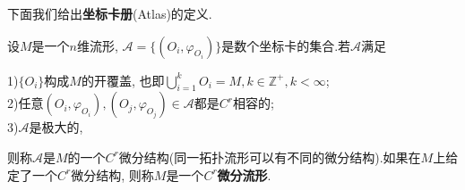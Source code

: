 下面我们给出\textbf{坐标卡册}(Atlas)的定义.
\begin{definition}
  设$M$是一个$n$维流形, $\mathcal{A}=\{(O_i,\varphi_{O_i})\}$是数个坐标卡的集合.若$\mathcal{A}$满足

  1)$\{O_i\}$构成$M$的开覆盖, 也即$\bigcup\limits_{i=1}^kO_i=M,k\in\mathbb{Z}^+,k<\infty$;\\
  2)任意$(O_i,\varphi_{O_i}),(O_j,\varphi_{O_j})\in\mathcal{A}$都是$C^r$相容的;\\
  3)$\mathcal{A}$是极大的,

  则称$\mathcal{A}$是$M$的一个$C^r$微分结构(同一拓扑流形可以有不同的微分结构).如果在$M$上给定了一个$C^r$微分结构, 则称$M$是一个\textbf{$C^r$微分流形}.
\end{definition}
